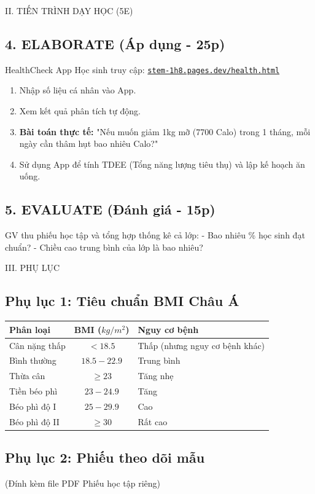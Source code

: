 \documentclass[12pt,a4paper]{article}
\begin{document}
\begin{sectionbox}{II. TIẾN TRÌNH DẠY HỌC (5E)}
\subsection*{4. ELABORATE (Áp dụng - 25p)}
\begin{activitybox}{HealthCheck App}
Học sinh truy cập: \href{https://stem-1h8.pages.dev/health.html}{\texttt{stem-1h8.pages.dev/health.html}}
\begin{enumerate}
    \item Nhập số liệu cá nhân vào App.
    \item Xem kết quả phân tích tự động.
    \item \textbf{Bài toán thực tế:} "Nếu muốn giảm 1kg mỡ (7700 Calo) trong 1 tháng, mỗi ngày cần thâm hụt bao nhiêu Calo?"
    \item Sử dụng App để tính TDEE (Tổng năng lượng tiêu thụ) và lập kế hoạch ăn uống.
\end{enumerate}
\end{activitybox}

\subsection*{5. EVALUATE (Đánh giá - 15p)}
GV thu phiếu học tập và tổng hợp thống kê cả lớp:
- Bao nhiêu \% học sinh đạt chuẩn?
- Chiều cao trung bình của lớp là bao nhiêu?
\end{sectionbox}

\newpage
\begin{sectionbox}{III. PHỤ LỤC}
\subsection*{Phụ lục 1: Tiêu chuẩn BMI Châu Á}
\begin{center}
\begin{tabular}{|l|c|l|}
\hline
\textbf{Phân loại} & \textbf{BMI ($kg/m^2$)} & \textbf{Nguy cơ bệnh} \\
\hline
Cân nặng thấp & $< 18.5$ & Thấp (nhưng nguy cơ bệnh khác) \\
Bình thường & $18.5 - 22.9$ & Trung bình \\
Thừa cân & $\ge 23$ & Tăng nhẹ \\
Tiền béo phì & $23 - 24.9$ & Tăng \\
Béo phì độ I & $25 - 29.9$ & Cao \\
Béo phì độ II & $\ge 30$ & Rất cao \\
\hline
\end{tabular}
\end{center}

\subsection*{Phụ lục 2: Phiếu theo dõi mẫu}
(Đính kèm file PDF Phiếu học tập riêng)
\end{sectionbox}
\end{document}
